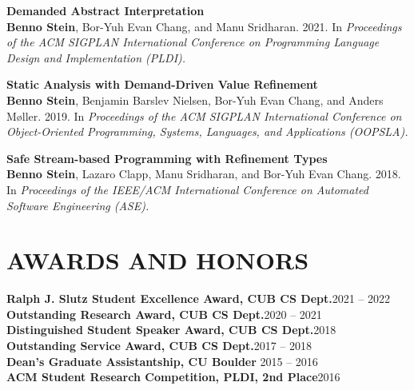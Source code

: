\documentclass[margin]{res}
\begin{document}
\begin{resume}
{\bf Demanded Abstract Interpretation}\\
{\bf Benno Stein}, Bor-Yuh Evan Chang, and Manu Sridharan.  2021. In {\em Proceedings of the ACM SIGPLAN International Conference on Programming Language Design and Implementation (PLDI).}\\\vspace{-1em}

{\bf Static Analysis with Demand-Driven Value Refinement}\\
{\bf Benno Stein}, Benjamin Barslev Nielsen, Bor-Yuh Evan Chang, and Anders M\o{}ller. 2019. In {\em Proceedings of  the ACM SIGPLAN International Conference on Object-Oriented Programming, Systems, Languages, and Applications (OOPSLA).}\\\vspace{-1em}

{\bf Safe Stream-based Programming with Refinement Types}\\
{\bf Benno Stein}, Lazaro Clapp, Manu Sridharan, and Bor-Yuh Evan Chang. 2018. In {\em Proceedings of the IEEE/ACM International Conference on Automated Software Engineering (ASE).}

\section{AWARDS AND HONORS}

{\bf Ralph J. Slutz Student Excellence Award, CUB CS Dept.}\hfill 2021 -- 2022\\
{\bf Outstanding Research Award, CUB CS Dept.}\hfill 2020 -- 2021\\
{\bf Distinguished Student Speaker Award, CUB CS Dept.}\hfill 2018\\
{\bf Outstanding Service Award, CUB CS Dept.}\hfill 2017 -- 2018\\
{\bf Dean's Graduate Assistantship, CU Boulder} \hfill 2015 -- 2016\\
{\bf ACM Student Research Competition, PLDI, 2nd Place}\hfill 2016\\


\end{resume}
\end{document}
